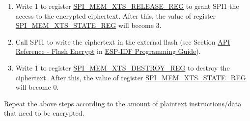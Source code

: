 \documentclass[main\_\_EN.tex]{subfiles}
\begin{document}
\begin{enumerate}
    \item Write 1 to register \hyperref[regdesc:SPIMEMXTSRELEASEREG]{SPI\_MEM\_XTS\_RELEASE\_REG} to grant SPI1 the access to the encrypted ciphertext. After this, the value of register \hyperref[regdesc:SPIMEMXTSSTATEREG]{SPI\_MEM\_XTS\_STATE\_REG} will become 3.

    \item Call SPI1 to write the ciphertext in the external flash (see Section \href{https://docs.espressif.com/projects/esp-idf/en/latest/esp32p4/api-reference/peripherals/spi_flash/index.html#api-reference-flash-encrypt}{API Reference - Flash Encrypt} in \href{https://docs.espressif.com/projects/esp-idf/en/latest/esp32p4/index.html}{ESP-IDF Programming Guide}).

    \item Write 1 to register \hyperref[regdesc:SPIMEMXTSDESTROYREG]{SPI\_MEM\_XTS\_DESTROY\_REG} to destroy the ciphertext. After this, the value of register \hyperref[regdesc:SPIMEMXTSSTATEREG]{SPI\_MEM\_XTS\_STATE\_REG} will become 0.

\end{enumerate}

Repeat the above steps according to the amount of plaintext instructions/data that need to be encrypted.
\end{document}
